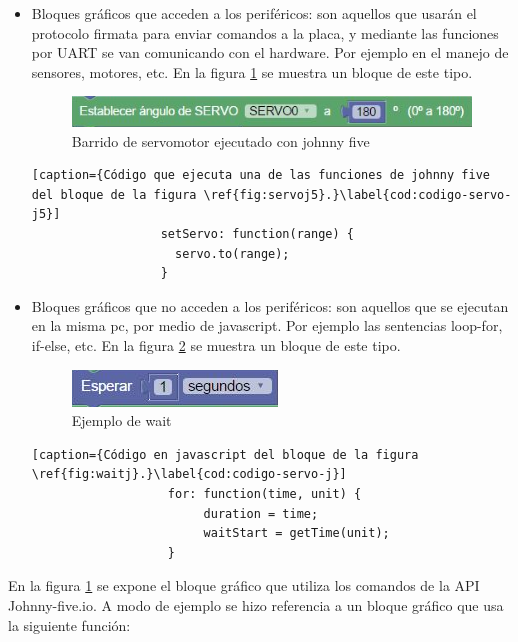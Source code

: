 \begin{itemize}
	\item Bloques gráficos que acceden a los periféricos: son aquellos que usarán el protocolo firmata para enviar comandos a la placa, y mediante las funciones por UART se van comunicando con el hardware. Por ejemplo en el manejo de sensores, motores, etc. En la figura \ref{fig:servoj5} se muestra un bloque de este tipo.
	
	
	\begin{figure}[!htbp]
		\centering
		\includegraphics[scale=.60]{./Figures/ejemplo-servo-j5.PNG}
		\caption{Barrido de servomotor ejecutado con johnny five}
		\label{fig:servoj5}
	\end{figure}
   
    \begin{lstlisting}[caption={Código que ejecuta una de las funciones de johnny five del bloque de la figura \ref{fig:servoj5}.}\label{cod:codigo-servo-j5}] 
                  setServo: function(range) {
                    servo.to(range);
                  }
    \end{lstlisting}
	
	\item Bloques gráficos que no acceden a los periféricos: son aquellos que se ejecutan en la misma pc, por medio de javascript. Por ejemplo las sentencias loop-for, if-else, etc.  En la figura \ref{fig:waitj} se muestra un bloque de este tipo.
	
	\begin{figure}[!htbp]
		\centering
		\includegraphics[scale=.60]{./Figures/ejemplo-servo-j.PNG}
		\caption{Ejemplo de wait}
		\label{fig:waitj}
	\end{figure}

	\begin{lstlisting}[caption={Código en javascript del bloque de la figura \ref{fig:waitj}.}\label{cod:codigo-servo-j}] 
			       for: function(time, unit) {
				        duration = time;
			        	waitStart = getTime(unit);
		           }
	\end{lstlisting}
\end{itemize}

En la figura \ref{fig:servoj5} se expone el bloque gráfico que utiliza los comandos de la API Johnny-five.io. A modo de ejemplo se hizo referencia a un bloque gráfico que usa la siguiente función: 

